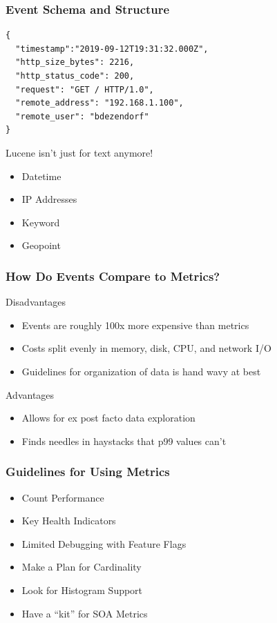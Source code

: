 \begin{frame}[fragile]
    \frametitle{Event Schema and Structure}

    \begin{lstlisting}
{
  "timestamp":"2019-09-12T19:31:32.000Z",
  "http_size_bytes": 2216,
  "http_status_code": 200,
  "request": "GET / HTTP/1.0",
  "remote_address": "192.168.1.100",
  "remote_user": "bdezendorf"
}
    \end{lstlisting}
    Lucene isn't just for text anymore!
    \begin{itemize}
        \item Datetime
        \item IP Addresses
        \item Keyword
        \item Geopoint
    \end{itemize}
\end{frame}

\begin{frame}
    \frametitle{How Do Events Compare to Metrics?}

    Disadvantages

    \begin{itemize}
        \item Events are roughly 100x more expensive than metrics
        \item Costs split evenly in memory, disk, CPU, and network I/O
        \item Guidelines for organization of data is hand wavy at best
    \end{itemize}

    Advantages

    \begin{itemize}
      \item Allows for ex post facto data exploration
      \item Finds needles in haystacks that p99 values can't
    \end{itemize}
\end{frame}

\begin{frame}
    \frametitle{Guidelines for Using Metrics}

    \begin{itemize}
        \item Count Performance
        \item Key Health Indicators
        \item Limited Debugging with Feature Flags
        \item Make a Plan for Cardinality
        \item Look for Histogram Support
        \item Have a ``kit'' for SOA Metrics
    \end{itemize}
\end{frame}


